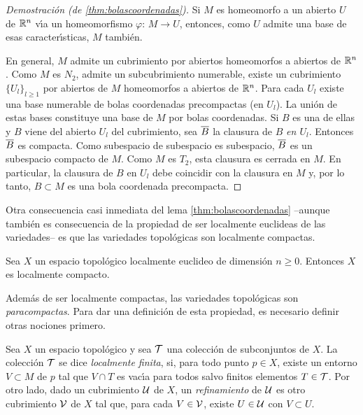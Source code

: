 \begin{proof}[Demostraci\'{o}n (de \ref{thm:bolascoordenadas})]
	Si $M$ es homeomorfo a un abierto $U$ de $\bb{R}^{n}$ v\'{\i}a un
	homeomorfismo $\varphi:\,M\rightarrow U$, entonces, como $U$ admite
	una base de esas caracter\'{\i}sticas, $M$ tambi\'{e}n.

	En general, $M$ admite un cubrimiento por abiertos homeomorfos a
	abiertos de $\bb{R}^{n}$. Como $M$ es $N_{2}$, admite un
	subcubrimiento numerable, existe un cubrimiento $\{U_{l}\}_{l\geq 1}$
	por abiertos de $M$ homeomorfos a abiertos de $\bb{R}^{n}$.
	Para cada $U_{l}$ existe una base numerable de bolas
	coordenadas precompactas (en $U_{l}$). La uni\'{o}n de estas bases
	constituye una base de $M$ por bolas coordenadas. Si $B$ es una de
	ellas y $B$ viene del abierto $U_{l}$ del cubrimiento, sea
	$\clos{B}$ la clausura de $B$ \emph{en $U_{l}$}. Entonces $\clos{B}$
	es compacta. Como subespacio de subespacio es subespacio, $\clos{B}$
	es un subespacio compacto de $M$. Como $M$ es $T_{2}$, esta clausura
	es cerrada en $M$. En particular, la clausura de $B$ en $U_{l}$ debe
	coincidir con la clausura en $M$ y, por lo tanto, $B\subset M$ es
	una bola coordenada precompacta.
\end{proof}

Otra consecuencia casi inmediata del lema \ref{thm:bolascoordenadas}
--aunque tambi\'{e}n es consecuencia de la propiedad de ser localmente
euclideas de las variedades-- es que las variedades topol\'{o}gicas son
localmente compactas.

\begin{propoVarTopLocComp}\label{thm:vartoploccomp}
	Sea $X$ un espacio topol\'{o}gico localmente euclideo de dimensi\'{o}n
	$n\geq 0$. Entonces $X$ es localmente compacto.
\end{propoVarTopLocComp}

Adem\'{a}s de ser localmente compactas, las variedades topol\'{o}gicas
son \emph{paracompactas}. Para dar una definici\'{o}n de esta propiedad,
es necesario definir otras nociones primero.

Sea $X$ un espacio topol\'{o}gico y sea $\cal{T}$ una colecci\'{o}n de
subconjuntos de $X$. La colecci\'{o}n $\cal{T}$ se dice \emph{localmente %
finita}, si, para todo punto $p\in X$, existe un entorno $V\subset M$ de $p$
tal que $V\cap T$ es vac\'{\i}a para todos salvo finitos elementos
$T\in\cal{T}$. Por otro lado, dado un cubrimiento $\cal{U}$ de $X$, un
\emph{refinamiento} de $\cal{U}$ es otro cubrimiento $\cal{V}$ de $X$ tal
que, para cada $V\in\cal{V}$, existe $U\in\cal{U}$ con $V\subset U$.

